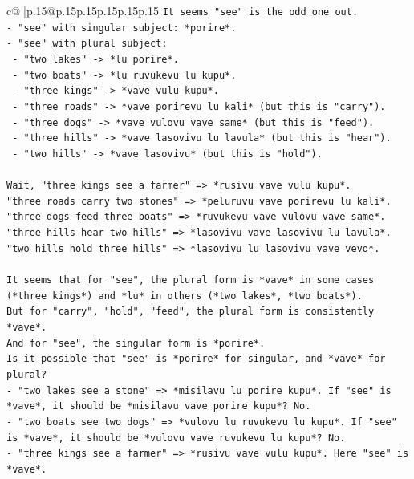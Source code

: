 \documentclass{article}
\begin{document}
{\begin{supertabular}{c@{$\;$}|p{.15\linewidth}@{}p{.15\linewidth}p{.15\linewidth}p{.15\linewidth}p{.15\linewidth}p{.15\linewidth}}
{{{\texttt{It seems "see" is the odd one out.} \\
\texttt{{-} "see" with singular subject: *porire*.} \\
\texttt{{-} "see" with plural subject:} \\
\texttt{  {-} "two lakes" {-}> *lu porire*.} \\
\texttt{  {-} "two boats" {-}> *lu ruvukevu lu kupu*.} \\
\texttt{  {-} "three kings" {-}> *vave vulu kupu*.} \\
\texttt{  {-} "three roads" {-}> *vave porirevu lu kali* (but this is "carry").} \\
\texttt{  {-} "three dogs" {-}> *vave vulovu vave same* (but this is "feed").} \\
\texttt{  {-} "three hills" {-}> *vave lasovivu lu lavula* (but this is "hear").} \\
\texttt{  {-} "two hills" {-}> *vave lasovivu* (but this is "hold").} \\
\\ 
\texttt{Wait, "three kings see a farmer" => *rusivu vave vulu kupu*.} \\
\texttt{"three roads carry two stones" => *peluruvu vave porirevu lu kali*.} \\
\texttt{"three dogs feed three boats" => *ruvukevu vave vulovu vave same*.} \\
\texttt{"three hills hear two hills" => *lasovivu vave lasovivu lu lavula*.} \\
\texttt{"two hills hold three hills" => *lasovivu lu lasovivu vave vevo*.} \\
\\ 
\texttt{It seems that for "see", the plural form is *vave* in some cases (*three kings*) and *lu* in others (*two lakes*, *two boats*).} \\
\texttt{But for "carry", "hold", "feed", the plural form is consistently *vave*.} \\
\texttt{And for "see", the singular form is *porire*.} \\
\texttt{Is it possible that "see" is *porire* for singular, and *vave* for plural?} \\
\texttt{{-} "two lakes see a stone" => *misilavu lu porire kupu*. If "see" is *vave*, it should be *misilavu vave porire kupu*? No.} \\
\texttt{{-} "two boats see two dogs" => *vulovu lu ruvukevu lu kupu*. If "see" is *vave*, it should be *vulovu vave ruvukevu lu kupu*? No.} \\
\texttt{{-} "three kings see a farmer" => *rusivu vave vulu kupu*. Here "see" is *vave*.} \\
}}}
\end{supertabular}}
\end{document}
